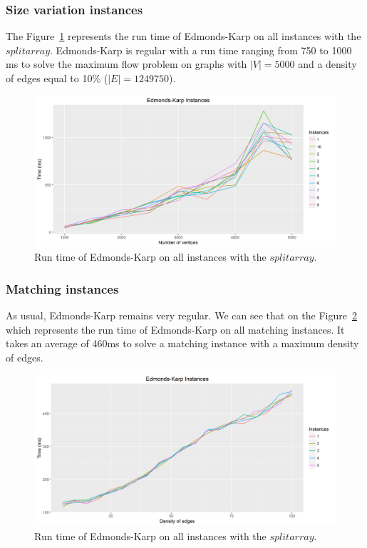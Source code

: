 \subsubsection{Size variation instances}
The Figure~\ref{fig:EKmeansize} represents the run time of Edmonds-Karp on all instances with the $split array$. Edmonds-Karp is regular with a run time ranging from 750 to 1000 ms to solve the maximum flow problem on graphs with $|V|=5000$ and a density of edges equal to 10\% ($|E|=1249750$).
\begin{figure}[H]
\begin{center}
\includegraphics[scale=0.5]{images/EKmeansize.png}
\caption{Run time of Edmonds-Karp on all instances with the $split array$.}
\label{fig:EKmeansize}
\end{center}
\end{figure}
\subsubsection{Matching instances}
As usual, Edmonds-Karp remains very regular. We can see that on the Figure~\ref{fig:ekmatching} which represents the run time of Edmonds-Karp on all matching instances. It takes an average of 460ms to solve a matching instance with a maximum density of edges.
\begin{figure}[H]
\begin{center}
\includegraphics[scale=0.5]{images/ekmatching.png}
\caption{Run time of Edmonds-Karp on all instances with the $split array$.}
\label{fig:ekmatching}
\end{center}
\end{figure}
